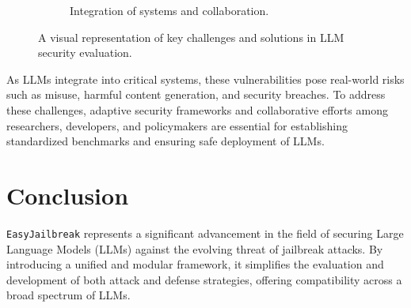 \documentclass[18pt]{article}
\begin{document}
\begin{figure}[H]
\begin{subfigure}[b]{0.48\textwidth}
{
        }
        \caption{Integration of systems and collaboration.}
        \label{fig:tikz_critical_integration}
    \end{subfigure}

    \caption{A visual representation of key challenges and solutions in LLM security evaluation.}
    \label{fig:combined_tikz_figures}
\end{figure}

\noindent As LLMs integrate into critical systems, these vulnerabilities pose real-world risks such as misuse, harmful content generation, and security breaches. To address these challenges, adaptive security frameworks and collaborative efforts among researchers, developers, and policymakers are essential for establishing standardized benchmarks and ensuring safe deployment of LLMs.



\section{Conclusion}

\texttt{EasyJailbreak} represents a significant advancement in the field of securing Large Language Models (LLMs) against the evolving threat of jailbreak attacks. By introducing a unified and modular framework, it simplifies the evaluation and development of both attack and defense strategies, offering compatibility across a broad spectrum of LLMs.
\end{document}
